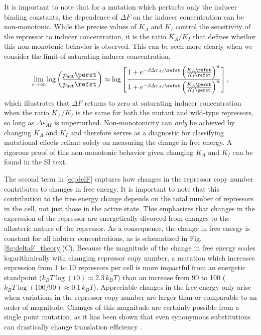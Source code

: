 It is important to note that for a mutation which perturbs only the inducer binding constants, the
dependence of $\Delta F$ on the inducer concentration can be non-monotonic. While the precise values of $K_A$ and $K_I$
control the sensitivity of the repressor to inducer concentration, it
is the ratio $K_A / K_I$ that defines whether this non-monotonic behavior is
observed. This can be seen more clearly when we consider the limit of saturating
inducer concentration,
\begin{equation}
    \lim\limits_{c \rightarrow \infty} \log\left({p_\text{act}\perst \over p_\text{act}\refst}\right) \approx \log\left[{1 + e^{-\beta\Delta\varepsilon_{AI}\refst} \left({K_A\refst \over K_I\refst}\right)^n \over 1 + e^{-\beta\Delta\varepsilon_{AI}\refst} \left({K_A\perst \over K_I\perst}\right)^n}\right]
    \label{eq:kaki_sat_c},
\end{equation}
which illustrates that $\Delta F$ returns to zero at saturating inducer
concentration when the ratio $K_A / K_I$ is the same for both the
mutant and wild-type repressors, so long as $\Delta\varepsilon_{AI}$ is
unperturbed. Non-monotonicity can \textit{only} be achieved by changing $K_A$
and $K_I$ and
therefore serves as a diagnostic for classifying mutational effects reliant
solely on  measuring the change in free energy. A rigorous proof of this
non-monotonic behavior given changing $K_A$ and $K_I$ can be found in  the SI text.


The second term in \eqref{eq:delF} captures how changes in the repressor
copy number contributes to changes in free energy. It is important to note that this
contribution to the free energy change depends on the total number of
repressors in the cell, not just those in the active state. This emphasizes
that changes in the expression of the repressor are energetically divorced
from changes to the allosteric nature of the repressor. As a consequence, the
change in free energy is constant for all inducer concentrations, as is
schematized in Fig. \ref{fig:deltaF_theory}(C). Because the magnitude of the change
in free energy scales logarithmically with changing repressor copy number, a mutation
which increases expression from 1 to 10 repressors per cell is more impactful
from an energetic standpoint ($k_BT \log(10) \approx 2.3\,  k_BT$) than an
increase from 90 to 100 ($k_BT \log(100/90) \approx 0.1\, k_BT$). Appreciable
changes in the free energy only arise when variations in the repressor copy
number are larger than or comparable to an order of magnitude. Changes of
this magnitude are certainly possible from a single point mutation, as it has
been shown that even synonymous substitutions can drastically change
translation efficiency \cite{Frumkin2018}.

